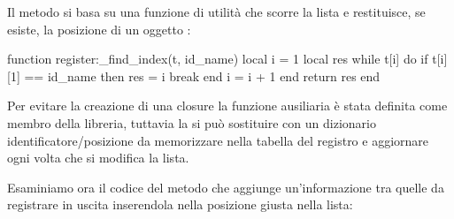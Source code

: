 Il metodo si basa su una funzione di utilità  che scorre la
lista e restituisce, se esiste, la posizione di un oggetto :
\begin{lines}
function register:_find_index(t, id_name)
    local i = 1
    local res
    while t[i] do
        if t[i][1] == id_name then
            res = i
            break
        end
        i = i + 1
    end
    return res
end
\end{lines}

Per evitare la creazione di una closure la funzione ausiliaria è stata definita
come membro della libreria, tuttavia la si può sostituire con un dizionario
identificatore/posizione da memorizzare nella tabella del registro e aggiornare
ogni volta che si modifica la lista.

Esaminiamo ora il codice del metodo  che aggiunge
un'informazione tra quelle da registrare in uscita inserendola nella posizione
giusta nella lista:
